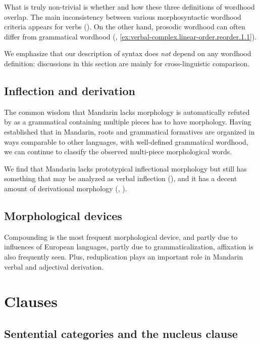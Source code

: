 \documentclass[UTF8, a4paper, oneside, scheme=plain, 12pt]{ctexrep}
\begin{document}
What is truly non-trivial is whether and how these three definitions of wordhood overlap.
The main inconsistency between various morphosyntactic wordhood criteria appears for verbs
().
On the other hand, prosodic wordhood can often differ from grammatical wordhood 
(, \ref{ex:verbal-complex.linear-order.reorder.1.1}).

We emphasize that our description of syntax does \emph{not} depend on any wordhood definition:
discussions in this section are mainly for cross-linguistic comparison.

\subsection{Inflection and derivation}

The common wisdom that Mandarin lacks morphology is automatically refuted
by 
as a grammatical containing multiple pieces has to have morphology.
Having established that in Mandarin, roots and grammatical formatives are organized 
in ways comparable to other languages,
with well-defined grammatical wordhood,
we can continue to classify the observed multi-piece morphological words.

We find that Mandarin lacks prototypical inflectional morphology 
but still has something that may be analyzed as verbal inflection (),
and it has a decent amount of derivational morphology
(,
).

\subsection{Morphological devices}

Compounding is the most frequent morphological device,
and partly due to influences of European languages, partly due to grammaticalization,
affixation is also frequently seen.
Plus, reduplication plays an important role in Mandarin verbal and adjectival derivation.



\section{Clauses}\label{sec:grammatical.clause}

\subsection{Sentential categories and the nucleus clause}\label{sec:grammatical.clause.high-level}
\end{document}
